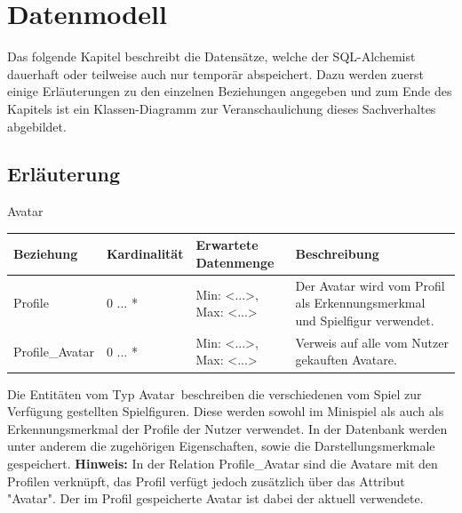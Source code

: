 
\chapter{Datenmodell}

Das folgende Kapitel beschreibt die Datensätze, welche der SQL-Alchemist dauerhaft oder teilweise auch nur temporär abspeichert.
Dazu werden zuerst einige Erl\"auterungen zu den einzelnen Beziehungen angegeben und zum Ende des Kapitels ist ein Klassen-Diagramm zur Veranschaulichung dieses Sachverhaltes abgebildet.


\section{Erläuterung}


\begin{entity}{10}{Avatar}
\begin{center}
	\begin{longtable}{|m{4cm}|m{}|m{}|m{}|}
 	 \hline
 	 \textbf{Beziehung} & \textbf{Kardinalität} &  \textbf{Erwartete Datenmenge} & \textbf{Beschreibung} \\
  	\hline
  	Profile & 0 ... *   & Min: <...>, Max: <...> & Der Avatar wird vom Profil als Erkennungsmerkmal und Spielfigur verwendet.\\
  	  	\hline
  	Profile\_Avatar & 0 ... *   & Min: <...>, Max: <...> & Verweis auf alle vom Nutzer gekauften Avatare.\\
	  \hline
	\end{longtable}
\end{center}
Die Entitäten vom Typ \glqq Avatar\grqq~beschreiben die verschiedenen vom Spiel zur Verfügung gestellten Spielfiguren. Diese werden sowohl im Minispiel als auch als Erkennungsmerkmal der Profile der Nutzer verwendet.
In der Datenbank werden unter anderem die zugehörigen Eigenschaften, sowie die Darstellungsmerkmale gespeichert.
\textbf{Hinweis:} In der Relation Profile\_Avatar sind die Avatare mit den Profilen verknüpft, das Profil verfügt jedoch zusätzlich über das Attribut "Avatar". Der im Profil gespeicherte Avatar ist dabei der aktuell verwendete.
\end{entity}


